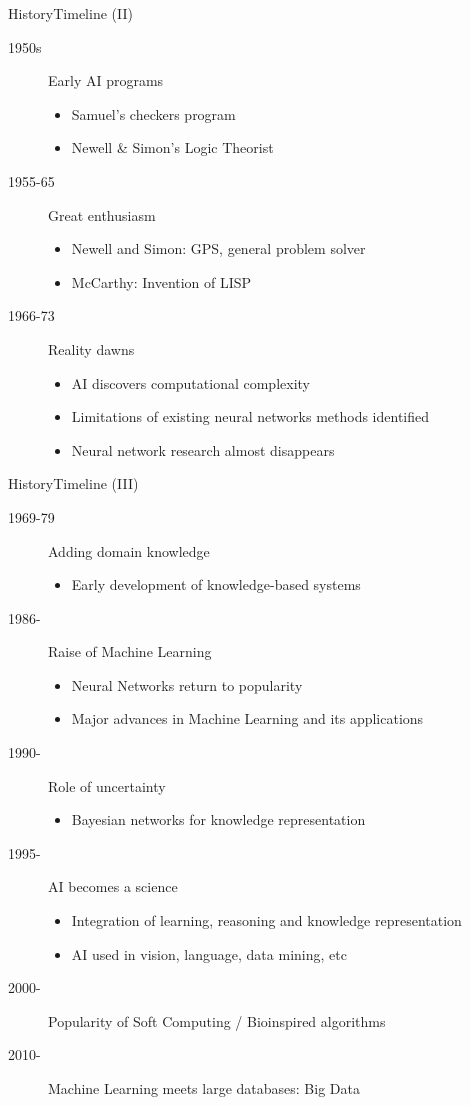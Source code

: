 \documentclass[10pt,compress]{beamer} %
\begin{document}
\begin{frame}{History}{Timeline (II)}
	\begin{description}
	\item[1950s] Early AI programs
		\begin{itemize}
		\item Samuel's checkers program
		\item Newell \& Simon's Logic Theorist
		\end{itemize}
	\item[1955-65] Great enthusiasm
		\begin{itemize}
		\item Newell and Simon: GPS, general problem solver
		\item McCarthy: Invention of LISP
		\end{itemize}
	\item[1966-73] Reality dawns
		\begin{itemize}
		\item AI discovers computational complexity
		\item Limitations of existing neural networks methods identified
		\item Neural network research almost disappears
		\end{itemize}
	\end{description}
\end{frame}

\begin{frame}[plain]{History}{Timeline (III)}
	\begin{description}
	\item[1969-79] Adding domain knowledge
		\begin{itemize}
		\item Early development of knowledge-based systems
		\end{itemize}
	\item[1986-] Raise of Machine Learning
		\begin{itemize}
		\item Neural Networks return to popularity
		\item Major advances in Machine Learning and its applications
		\end{itemize}
	\item[1990-] Role of uncertainty
		\begin{itemize}
		\item Bayesian networks for knowledge representation
		\end{itemize}
	\item[1995-] AI becomes a science
		\begin{itemize}
		\item Integration of learning, reasoning and knowledge representation
		\item AI used in vision, language, data mining, etc
		\end{itemize}
	\item[2000-] Popularity of Soft Computing / Bioinspired algorithms
	\item[2010-] Machine Learning meets large databases: Big Data
	\end{description}
\end{frame}
\end{document}
